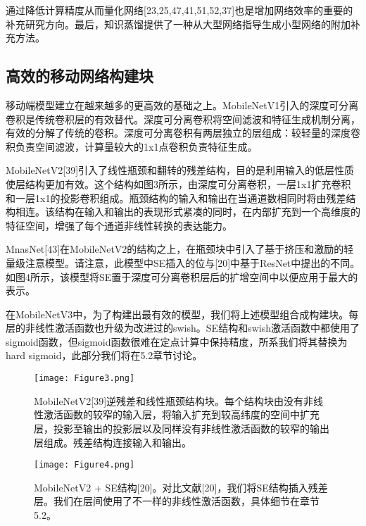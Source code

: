 通过降低计算精度从而量化网络[23,25,47,41,51,52,37]也是增加网络效率的重要的补充研究方向。最后，知识蒸馏提供了一种从大型网络指导生成小型网络的附加补充方法。

\subsection{高效的移动网络构建块}

移动端模型建立在越来越多的更高效的基础之上。MobileNetV1引入的深度可分离卷积是传统卷积层的有效替代。深度可分离卷积将空间滤波和特征生成机制分离，有效的分解了传统的卷积。深度可分离卷积有两层独立的层组成：较轻量的深度卷积负责空间滤波，计算量较大的1x1点卷积负责特征生成。

MobileNetV2[39]引入了线性瓶颈和翻转的残差结构，目的是利用输入的低层性质使层结构更加有效。这个结构如图3所示，由深度可分离卷积，一层1x1扩充卷积和一层1x1的投影卷积组成。瓶颈结构的输入和输出在当通道数相同时将由残差结构相连。该结构在输入和输出的表现形式紧凑的同时，在内部扩充到一个高维度的特征空间，增强了每个通道非线性转换的表达能力。

MnasNet[43]在MobileNetV2的结构之上，在瓶颈块中引入了基于挤压和激励的轻量级注意模型。请注意，此模型中SE插入的位与[20]中基于ResNet中提出的不同。如图4所示，该模型将SE置于深度可分离卷积层后的扩增空间中以便应用于最大的表示。

在MobileNetV3中，为了构建出最有效的模型，我们将上述模型组合成构建块。每层的非线性激活函数也升级为改进过的swish。SE结构和swish激活函数中都使用了sigmoid函数，但sigmoid函数很难在定点计算中保持精度，所系我们将其替换为hard sigmoid，此部分我们将在5.2章节讨论。

\begin{figure}[ht]
    \centering
    \texttt{[image: Figure3.png]}
    \caption{MobileNetV2[39]逆残差和线性瓶颈结构块。每个结构块由没有非线性激活函数的较窄的输入层，将输入扩充到较高纬度的空间中扩充层，投影至输出的投影层以及同样没有非线性激活函数的较窄的输出层组成。残差结构连接输入和输出。}
\end{figure}


\begin{figure}[ht]
    \centering
    \texttt{[image: Figure4.png]}
    \caption{MobileNetV2 + SE结构[20]。对比文献[20]，我们将SE结构插入残差层。我们在层间使用了不一样的非线性激活函数，具体细节在章节5.2。}
\end{figure}